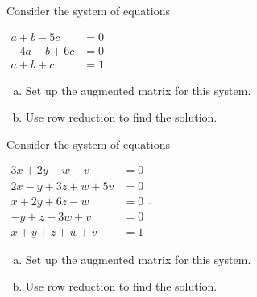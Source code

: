 \begin{xca}
Consider the system of equations 

$\begin{matrix}
a+b-5c&=0\\-4a-b+6c&=0\\a+b+c&=1
\end{matrix}$
\begin{enumerate}[(a)]
\item Set up the augmented matrix for this system.
\item Use row reduction to find the solution.

\end{enumerate}
\end{xca}

\begin{xca}
Consider the system of equations 

$\begin{matrix}
3x+2y-w-v&=0\\2x-y+3z+w+5v&=0\\x+2y+6z-w&=0\\ -y+z-3w+v&=0\\x+y+z+w+v&=1
\end{matrix}$.
\begin{enumerate}[(a)]
\item Set up the augmented matrix for this system.
\item Use row reduction to find the solution.

\end{enumerate}
\end{xca}







 